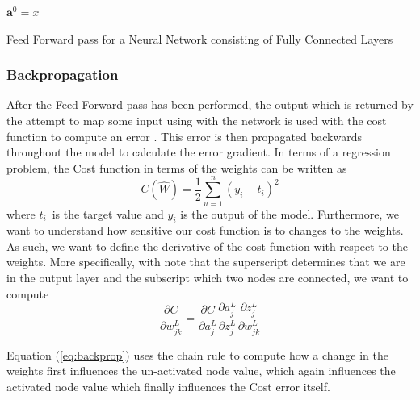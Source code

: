 \documentclass
[twocolumn,
secnumarabic,
nobibnotes,
aps,
prl,
reprint,
groupedaddress,
amsmath,
amssymb
]{revtex4-2}
\begin{document}
\begin{algorithm}
  $\bm{a}^0 = x$\;
  \caption{\label{alg:ff}Feed Forward pass for a Neural Network consisting of Fully Connected Layers}
\end{algorithm}

\subsubsection{Backpropagation}
After the Feed Forward pass has been performed, the output which is returned by the attempt to map some input using with the network is used with the cost function to compute an error \cite{Goodfellow2016}. This error is then propagated backwards throughout the model to calculate the error gradient. In terms of a regression problem, the Cost function in terms of the weights can be written as
\begin{equation}
  \nonumber
  C\left(\hat{W}\right) = \frac{1}{2}\sum_{u=1}^n\left(y_i - t_i\right)^2
\end{equation}
where $t_i$ is the target value and $y_i$ is the output of the model. Furthermore, we want to understand how sensitive our cost function is to changes to the weights. As such, we want to define the derivative of the cost function with respect to the weights. More specifically, with note that the superscript determines that we are in the output layer and the subscript which two nodes are connected, we want to compute
\begin{equation}
  \label{eq:backprop}
  \frac{\partial{C}}{\partial{w_{jk}^L}} = \frac{\partial{C}}{\partial{a_j^L}}\frac{\partial{a_j^L}}{\partial{z_j^L}}\frac{\partial{z_j^L}}{\partial{w_{jk}^L}}
\end{equation}

Equation (\ref{eq:backprop}) uses the chain rule to compute how a change in the weights first influences the un-activated node value, which again influences the activated node value which finally influences the Cost error itself.
\end{document}
